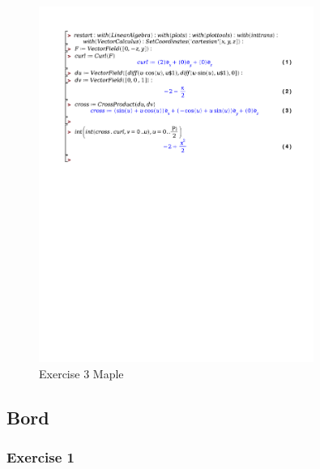 \documentclass[a4paper]{report}
\begin{document}
\begin{figure}[H]
	\centering
	\includegraphics[width=0.8\textwidth]{exercises/wc_7_ex_3.pdf}
	\caption{Exercise 3 Maple}
\end{figure}

\subsection{Bord}

\subsubsection{Exercise 1}
\end{document}
